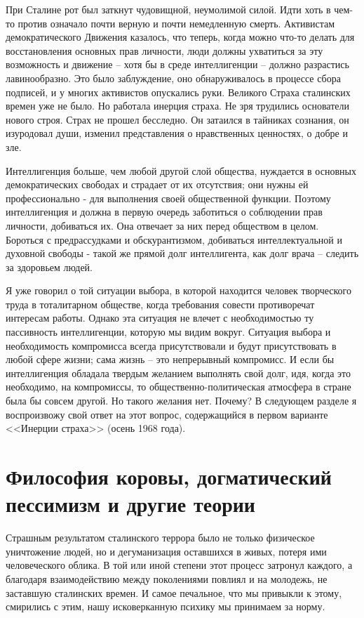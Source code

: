 \documentclass{book}
\begin{document}
При Сталине рот был заткнут чудовищной, неумолимой силой. Идти хоть в чем-то против означало почти верную и почти немедленную смерть. Активистам демократического Движения казалось, что теперь, когда можно что-то делать для восстановления основных прав личности, люди должны ухватиться за эту возможность и движение -- хотя бы в среде интеллигенции -- должно разрастись лавинообразно. Это было заблуждение, оно обнаруживалось в процессе сбора под­писей, и у многих активистов опускались руки. Великого Стра­ха сталинских времен уже не было. Но работала инерция стра­ха. Не зря трудились основатели нового строя. Страх не про­шел бесследно. Он затаился в тайниках сознания, он изуродовал души, изменил представления о нравственных ценностях, о добре и зле.

Интеллигенция больше, чем любой другой слой общества, нуждается в основных демократических свободах и страдает от их отсутствия; они нужны ей профессионально - для выполнения своей общественной функции. Поэтому интеллигенция и должна в первую очередь заботиться о соблюдении прав личности, добиваться их. Она отвечает за них перед обществом в целом. Бороться с предрассудками и обскурантизмом, добиваться интеллектуальной и духовной свободы - такой же прямой долг интеллигента, как долг врача -- следить за здоровьем людей.

Я уже говорил о той ситуации выбора, в которой находится человек творческого труда в тоталитарном обществе, когда требования совести противоречат интересам работы. Однако эта ситуация не влечет с необходимостью ту пассивность интеллигенции, которую мы видим вокруг. Ситуация выбора и необходимость компромисса всегда присутствовали и будут присутствовать в любой сфере жизни; сама жизнь -- это непрерывный компромисс. И если бы интеллигенция обладала твердым желанием выполнять свой долг, идя, когда это необходимо, на компромиссы, то общественно-политическая атмосфера в стране была бы совсем другой. Но такого желания нет. Почему? В следующем разделе я воспроизвожу свой ответ на этот вопрос, содержащийся в первом варианте <<Инерции страха>> (осень 1968 года).


\section{Философия коровы, догматический пессимизм и другие теории}

Страшным результатом сталинского террора было не только физическое уничтожение людей, но и дегуманизация оставшихся в живых, потеря ими человеческого облика. В той или иной степени этот процесс затронул каждого, а благодаря взаимодействию между поколениями повлиял и на молодежь, не заставшую сталинских времен. И самое печальное, что мы привыкли к этому, смирились с этим, нашу исковерканную психику мы принимаем за норму.
\end{document}
